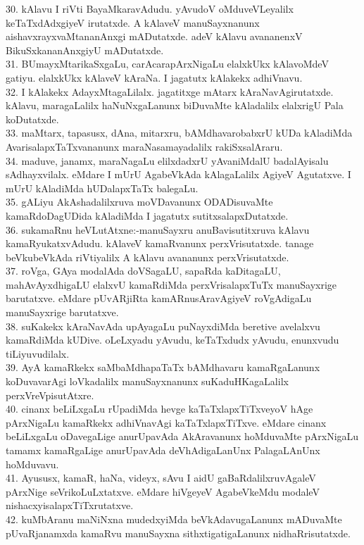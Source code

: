 \documentclass{article}
\begin{document}
30. kAlavu I riVti BayaMkaravAdudu. yAvudoV oMduveVLeyalilx keTaTxdAdxgiyeV irutatxde. A kAlaveV manuSayxnanunx aishavxrayxvaMtananAnxgi mADutatxde. adeV kAlavu avananenxV BikuSxkananAnxgiyU mADutatxde.\\
31. BUmayxMtarikaSxgaLu, carAcarapArxNigaLu elalxkUkx kAlavoMdeV gatiyu. elalxkUkx kAlaveV kAraNa. I jagatutx kAlakekx adhiVnavu.\\
32. I kAlakekx AdayxMtagaLilalx. jagatitxge mAtarx kAraNavAgirutatxde. kAlavu, maragaLalilx haNuNxgaLanunx biDuvaMte kAladalilx elalxrigU Pala koDutatxde.\\
33. maMtarx, tapasusx, dAna, mitarxru, bAMdhavarobabxrU kUDa kAladiMda AvarisalapxTaTxvananunx maraNasamayadalilx rakiSxsalAraru.\\
34. maduve, janamx, maraNagaLu elilxdadxrU yAvaniMdalU badalAyisalu sAdhayxvilalx. eMdare I mUrU AgabeVkAda kAlagaLalilx AgiyeV Agutatxve. I mUrU kAladiMda hUDalapxTaTx balegaLu.\\
35. gALiyu AkAshadalilxruva moVDavanunx ODADisuvaMte kamaRdoDagUDida kAladiMda I jagatutx sutitxsalapxDutatxde.\\
36. sukamaRnu heVLutAtxne:-manuSayxru anuBavisutitxruva kAlavu kamaRyukatxvAdudu. kAlaveV kamaRvanunx perxVrisutatxde. tanage beVkubeVkAda riVtiyalilx A kAlavu avananunx perxVrisutatxde.\\
37. roVga, GAya modalAda doVSagaLU, sapaRda kaDitagaLU, mahAvAyxdhigaLU elalxvU kamaRdiMda perxVrisalapxTuTx manuSayxrige barutatxve. eMdare pUvARjiRta kamARnusAravAgiyeV roVgAdigaLu manuSayxrige barutatxve.\\
38. suKakekx kAraNavAda upAyagaLu puNayxdiMda beretive avelalxvu kamaRdiMda kUDive. oLeLxyadu yAvudu, keTaTxdudx yAvudu, enunxvudu tiLiyuvudilalx.\\
39. AyA kamaRkekx saMbaMdhapaTaTx bAMdhavaru kamaRgaLanunx koDuvavarAgi loVkadalilx manuSayxnanunx suKaduHKagaLalilx perxVreVpisutAtxre.\\
40. cinanx beLiLxgaLu rUpadiMda hevge kaTaTxlapxTiTxveyoV hAge pArxNigaLu kamaRkekx adhiVnavAgi kaTaTxlapxTiTxve. eMdare cinanx beLiLxgaLu oDavegaLige anurUpavAda AkAravanunx hoMduvaMte pArxNigaLu tamamx kamaRgaLige anurUpavAda deVhAdigaLanUnx PalagaLAnUnx hoMduvavu.\\
41. Ayususx, kamaR, haNa, videyx, sAvu I aidU gaBaRdalilxruvAgaleV pArxNige seVrikoLuLxtatxve. eMdare hiVgeyeV AgabeVkeMdu modaleV nishacxyisalapxTiTxrutatxve.\\
42. kuMbAranu maNiNxna mudedxyiMda beVkAdavugaLanunx mADuvaMte pUvaRjanamxda kamaRvu manuSayxna sithxtigatigaLanunx nidhaRrisutatxde.\\
\end{document}
